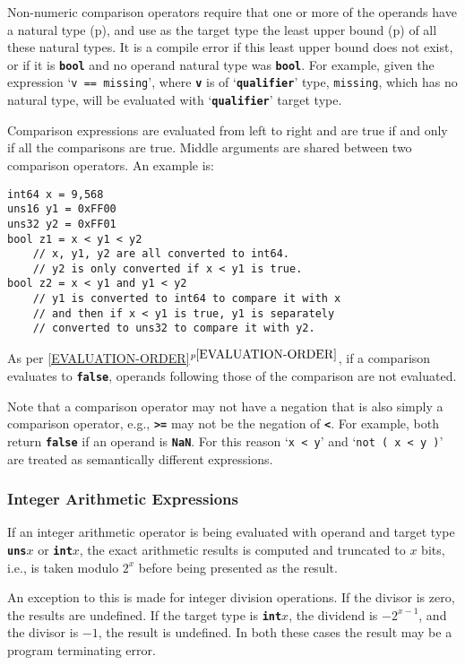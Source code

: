 \documentclass[12pt]{article}
\newcommand{\TT}[1]{{\tt \bfseries #1}}
\newcommand{\itemref}[1]{\ref{#1}$^{p\pageref{#1}}$}
\newcommand{\pagref}[1]{p\pageref{#1}}
\newenvironment{indpar}[1][0.3in]%
	{\begin{list}{}%
		     {\setlength{\itemsep}{0in}%
		      \setlength{\topsep}{0in}%
		      \setlength{\parsep}{1ex}%
		      \setlength{\labelwidth}{#1}%
		      \setlength{\leftmargin}{#1}%
		      \addtolength{\leftmargin}{\labelsep}}%
	 \item}%
	{\end{list}}
\begin{document}
Non-numeric comparison operators require that one or more of
the operands have a natural type (\pagref{NATURAL-TYPE}),
and use as the target type
the least upper bound (\pagref{LEAST-UPPER-BOUND})
of all these natural types.
It is a compile error if this least upper bound does
not exist, or if it is \TT{bool} and no operand natural type was \TT{bool}.
For example, given the expression `{\tt v == missing}', where \TT{v}
is of `\TT{qualifier}' type, {\tt missing}, which has no natural type, will be
evaluated with `\TT{qualifier}' target type.

Comparison expressions are evaluated from left to right and are
true if and only if all the comparisons are true.  Middle
arguments are shared between two comparison operators.
An example is:

\begin{indpar}\begin{verbatim}
int64 x = 9,568
uns16 y1 = 0xFF00
uns32 y2 = 0xFF01
bool z1 = x < y1 < y2
    // x, y1, y2 are all converted to int64.
    // y2 is only converted if x < y1 is true.
bool z2 = x < y1 and y1 < y2
    // y1 is converted to int64 to compare it with x
    // and then if x < y1 is true, y1 is separately
    // converted to uns32 to compare it with y2.
\end{verbatim}\end{indpar}

As per \itemref{EVALUATION-ORDER}, if a comparison evaluates
to \TT{false}, operands following those of the comparison
are not evaluated.

Note that a comparison operator may not have a negation that is
also simply a comparison operator, e.g., \TT{>=} may not be the
negation of \TT{<}.  For example, both return \TT{false} if an
operand is \TT{NaN}.  For this reason `{\tt x < y}' and
`{\tt not ( x < y )}' are treated as semantically different
expressions.

\subsubsection{Integer Arithmetic Expressions}

If an integer arithmetic operator is being evaluated with
operand and target type \TT{uns$x$} or \TT{int$x$}, the
exact arithmetic results is computed and truncated to
$x$ bits, i.e., is taken modulo $2^x$ before being presented
as the result.

An exception to this is made for integer division operations.
If the divisor is zero, the results are undefined.  If the
target type is \TT{int$x$}, the dividend is $-2^{x-1}$, and
the divisor is $-1$, the result is undefined.  In both these
cases the result may be a program terminating error.
\end{document}
